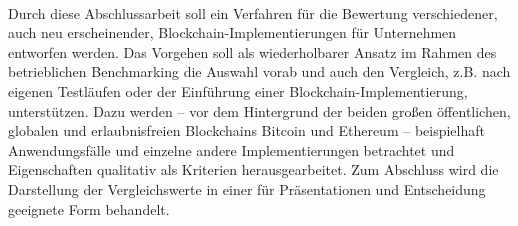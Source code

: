 
\hspace{1em}\,\vspace{3em}
\setcounter{page}{1}

Durch diese Abschlussarbeit soll ein Verfahren für die Bewertung verschiedener, auch neu erscheinender, Blockchain-Implementierungen für Unternehmen entworfen werden.
Das Vorgehen soll als wiederholbarer Ansatz im Rahmen des betrieblichen Benchmarking die Auswahl vorab und auch den Vergleich, z.B. nach eigenen Testläufen oder der Einführung einer Blockchain-Implementierung, unterstützen.
Dazu werden -- vor dem Hintergrund der beiden großen öffentlichen, globalen und erlaubnisfreien Blockchains Bitcoin und Ethereum -- beispielhaft Anwendungsfälle und einzelne andere Implementierungen betrachtet und Eigenschaften qualitativ als Kriterien herausgearbeitet. Zum Abschluss wird die Darstellung der Vergleichswerte in einer für Präsentationen und Entscheidung geeignete Form behandelt. 

